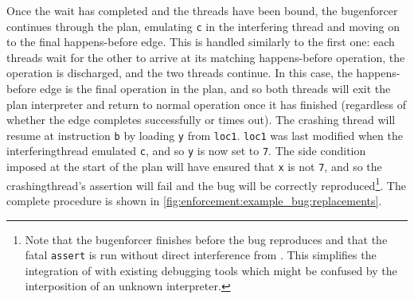Once the wait has completed and the threads have been bound, the
\gls{bugenforcer} continues through the plan, emulating \texttt{c} in
the interfering thread and moving on to the final happens-before edge.
This is handled similarly to the first one: each threads wait for the
other to arrive at its matching happens-before operation, the
operation is discharged, and the two threads continue.  In this case,
the happens-before edge is the final operation in the plan, and so
both threads will exit the \gls{plan interpreter} and return to normal
operation once it has finished (regardless of whether the edge
completes successfully or times out).  The crashing thread will resume
at instruction {\tt b} by loading \texttt{y} from \texttt{loc1}.
\texttt{loc1} was last modified when the \gls{interferingthread}
emulated \texttt{c}, and so \texttt{y} is now set to \texttt{7}.  The
side condition imposed at the start of the plan will have ensured that
\texttt{x} is not \texttt{7}, and so the \gls{crashingthread}'s
assertion will fail and the bug will be correctly
reproduced\footnote{Note that the \protect\gls{bugenforcer} finishes
  before the bug reproduces and that the fatal \texttt{assert} is run
  without direct interference from {\technique}.  This simplifies the
  integration of {\technique} with existing debugging tools which
  might be confused by the interposition of an unknown interpreter.}\!\hspace{-.1ex}\!.
The complete procedure is shown in
\autoref{fig:enforcement:example_bug:replacements}.

